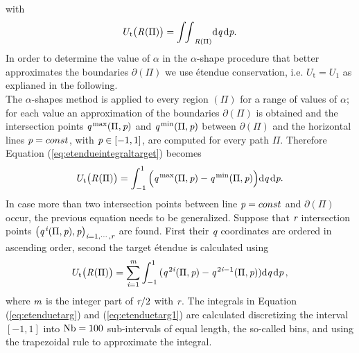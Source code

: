 with
\begin{equation}\label{eq:etendueintegraltarget}
U_\textrm{t}\big(\mbox{$\emph{R}_{\textit{}}$}(\Pi)\big) = {\int\!\!\int}_{\emph{R}(\Pi)} \textrm{d}\textit{q}\,\textrm{d}\textit{p}.
\end{equation}
In order to determine the value of $\alpha$ in the $\alpha$-shape procedure that better approximates the boundaries $\partial$$(\Pi)$ we use \'{e}tendue conservation, i.e. $U_{\textrm{t}}= U_1$ as explianed in the following.\\ \indent
The $\alpha$-shapes method is applied to every region $(\Pi)$ for a range of values of $\alpha$;
   for each value an approximation of the boundaries $\partial$$(\Pi)$ is obtained and
   the intersection points $\textit{q}^{\textrm{\,max}}(\Pi,\textit{p})$ and $\textit{q}^{\textrm{\,min}}(\Pi,\textit{p})$ between $\partial$$(\Pi)$
and the horizontal lines $\textit{p}=const$, with $\textit{p}\in[-1,1]$, are computed for every path $\Pi$.
Therefore Equation (\ref{eq:etendueintegraltarget}) becomes
\begin{equation}\label{eq:etenduetarg}
 U_\textrm{t}\big(\mbox{$\emph{R}_{\textit{}}$}(\Pi)\big)= \int_{-1}^{1}{\Big(\textit{q}^{\textrm{\,max}}(\Pi,\textit{p})-\textit{q}^{\textrm{\,min}}(\Pi,\textit{p})\Big)} \textrm{d}\textit{q}\,\textrm{d}\textit{p}.
\end{equation} In case more than two intersection points between line $\textit{p}=const$ and $\partial$$(\Pi)$ occur, the previous equation needs to be generalized. Suppose that $\textit{r}$ intersection points $\big(\textit{q}^{\,\textit{i}}(\Pi,\textit{p}), \textit{p}\big)_{\textit{i} = 1, \cdots, \textit{r}}$ are found. 
First their $\textit{q}$ coordinates are ordered in ascending order, second the target \'{e}tendue is calculated using
\begin{equation}\label{eq:etenduetarg1}
 U_\textrm{t}\big(\mbox{$\emph{R}_{\textit{}}$}(\Pi)\big) =\sum_{\textit{i} = 1}^{\textit{m}} \int_{-1}^{1}
{(\textit{q}^{\,2\textit{i}}(\Pi,\textit{p})}-{\textit{q}^{\,2\textit{i}-1} (\Pi, \textit{p}) )} \textrm{d}\textit{q}\,\textrm{d}\textit{p}\,,
\end{equation}
where $\textit{m}$ is the integer part of $\textit{r}/2$ with $\textit{r}$. 
The integrals in Equation (\ref{eq:etenduetarg}) and (\ref{eq:etenduetarg1}) are calculated discretizing the interval $[-1, 1]$
   into $\textrm{Nb}=100$ sub-intervals of equal length, the so-called bins, and using the trapezoidal rule to approximate the integral.
